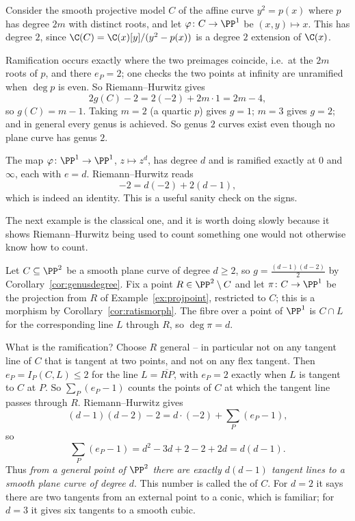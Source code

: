 \begin{example}\label{ex:hyperelliptic}
	Consider the smooth projective model $C$ of the affine curve $y^2 = p(x)$ where $p$ has degree $2m$ with distinct roots, and let $\varphi \colon C \to \PP^1$ be $(x,y)\mapsto x$. This has degree $2$, since $\C(C) = \C(x)[y]/(y^2-p(x))$ is a degree $2$ extension of $\C(x)$.

	Ramification occurs exactly where the two preimages coincide, i.e.\ at the $2m$ roots of $p$, and there $e_P = 2$; one checks the two points at infinity are unramified when $\deg p$ is even. So Riemann--Hurwitz gives
	$$2g(C)-2 = 2(-2) + 2m\cdot 1 = 2m-4,$$
	so $g(C) = m-1$. Taking $m = 2$ (a quartic $p$) gives $g = 1$; $m = 3$ gives $g = 2$; and in general every genus is achieved. So genus $2$ curves exist even though no plane curve has genus $2$.
\end{example}

\begin{example}
	The map $\varphi \colon \PP^1\to\PP^1$, $z \mapsto z^d$, has degree $d$ and is ramified exactly at $0$ and $\infty$, each with $e = d$. Riemann--Hurwitz reads
	$$-2 = d(-2) + 2(d-1),$$
	which is indeed an identity. This is a useful sanity check on the signs.
\end{example}

The next example is the classical one, and it is worth doing slowly because it shows Riemann--Hurwitz being used to count something one would not otherwise know how to count.

\begin{example}\label{ex:class}
	Let $C \subseteq \PP^2$ be a smooth plane curve of degree $d \geq 2$, so $g = \frac{(d-1)(d-2)}{2}$ by Corollary~\ref{cor:genusdegree}. Fix a point $R \in \PP^2\setminus C$ and let $\pi \colon C \to \PP^1$ be the projection from $R$ of Example~\ref{ex:projpoint}, restricted to $C$; this is a morphism by Corollary~\ref{cor:ratismorph}. The fibre over a point of $\PP^1$ is $C \cap L$ for the corresponding line $L$ through $R$, so $\deg\pi = d$.

	What is the ramification? Choose $R$ general -- in particular not on any tangent line of $C$ that is tangent at two points, and not on any flex tangent. Then $e_P = I_P(C,L) \leq 2$ for the line $L = \overline{RP}$, with $e_P = 2$ exactly when $L$ is tangent to $C$ at $P$. So $\sum_P(e_P-1)$ counts the points of $C$ at which the tangent line passes through $R$. Riemann--Hurwitz gives
	$$(d-1)(d-2) - 2 = d\cdot(-2) + \sum_{P}(e_P-1),$$
	so
	$$\sum_P (e_P - 1) = d^2 - 3d + 2 - 2 + 2d = d(d-1).$$
	Thus \emph{from a general point of $\PP^2$ there are exactly $d(d-1)$ tangent lines to a smooth plane curve of degree $d$}. This number is called the  of $C$. For $d = 2$ it says there are two tangents from an external point to a conic, which is familiar; for $d = 3$ it gives six tangents to a smooth cubic.
\end{example}

